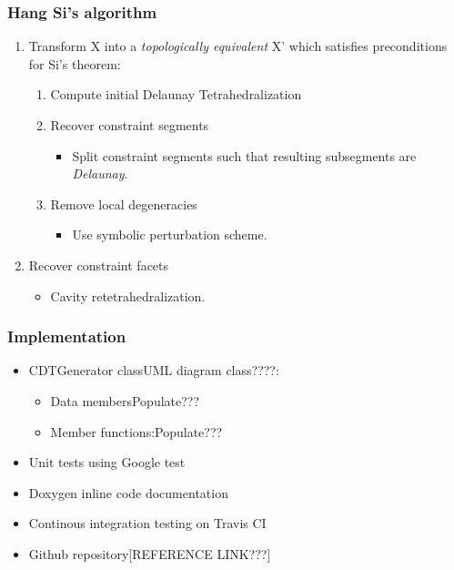 \documentclass{beamer}
\begin{document}
	\begin{frame}
		\frametitle{Hang Si's algorithm} 
			\begin{enumerate}
				\item Transform X into a \textit{topologically equivalent} X' which satisfies preconditions for Si's theorem:	
				\begin{enumerate}
					\item Compute initial Delaunay Tetrahedralization	
					\item Recover constraint segments
						\begin{itemize}
							\item Split constraint segments such that resulting subsegments are \textit{Delaunay}.	
						\end{itemize}	
					\item Remove local degeneracies
						\begin{itemize}
							\item Use symbolic perturbation scheme.
						\end{itemize}		
				\end{enumerate}
				\item Recover constraint facets
					\begin{itemize}
						\item Cavity retetrahedralization.	
					\end{itemize}		
			\end{enumerate}		
	\end{frame}
	\begin{frame}
		\frametitle{Implementation}
			\begin{itemize}
				\item CDTGenerator class{UML diagram class????}:
					\begin{itemize}
						\item Data members{Populate???}
						\item Member functions:{Populate???}	
					\end{itemize}		
				\item Unit tests using Google test
				\item Doxygen inline code documentation
				\item Continous integration testing on Travis CI	
				\item Github repository[REFERENCE LINK???]	
			\end{itemize}
	\end{frame}	
\end{document}
